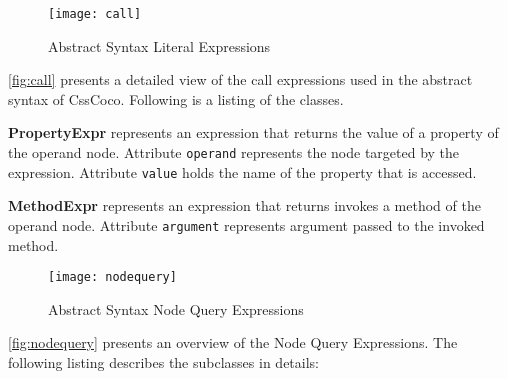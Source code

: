 \begin{figure}[h!]
  \centering
  \caption{Abstract Syntax Literal Expressions}
  \label{fig:call}
  \texttt{[image: call]}
\end{figure}

\autoref{fig:call} presents a detailed view of the call expressions used in the abstract syntax of CssCoco. Following is a listing of the classes. 

\begin{description}

\item\textbf{PropertyExpr} represents an expression that returns the value of a property of the operand node. Attribute \texttt{operand} represents the node targeted by the expression. Attribute \texttt{value} holds the name of the property that is accessed.

\item\textbf{MethodExpr} represents an expression that returns invokes a method of the operand node. Attribute \texttt{argument} represents argument passed to the invoked method.

\end{description}

\begin{figure}[h!]
  \centering
  \caption{Abstract Syntax Node Query Expressions}
  \label{fig:nodequery}
  \texttt{[image: nodequery]}
\end{figure}

\autoref{fig:nodequery} presents an overview of the Node Query Expressions. The following listing describes the subclasses in details:

